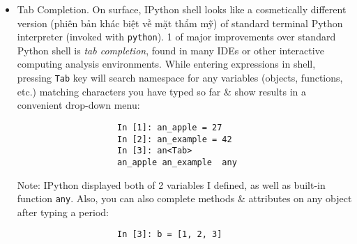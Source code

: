 \documentclass{article}
\newtheorem{remark}{Remark}
\begin{document}
\begin{enumerate}
\begin{itemize}
\begin{itemize}
\begin{itemize}
				\begin{remark}
					Many people use Jupyter as a local computing environment, but it can also be deployed on servers \& accessed remotely. Won't cover those details here, but encourage to explore this topic on internet if it's relevant to your needs.
				\end{remark}
				To create a new notebook, click {\tt New} button \& select {\tt Python 3} option. Should see sth like {\sf Fig. 2.2: Jupyter new notebook view}. If this is 1st time, try clicking on empty code ``cell'' \& entering a line of Python code. Then press Shift-Enter to execute it.
				
				When save notebook (see {\tt Save \& Checkpoint} under notebook {\tt File} menu), it creates a file with extension {\tt.ipynb}: a self-contained file format containing all of content (including any evaluated code output) currently in notebook. These can be loaded \& edited by other Jupyter users.
				
				To rename an open notebook, click on notebook title at top of page \& type new title, pressing {\tt Enter} when finished.
				
				To load an existing notebook, put file in same directory where started notebook process (or in a subfolder within it), then click name from landing page. Can try it out with notebooks from {\tt wesm/pydata-book} repository on GitHub {\sf Fig. 2.3: Jupyter example view for an existing notebook}.
				
				When want to close a notebook, click File menu \& select {\tt Close \& Halt}. If simply close browser tab, Python process associated with notebook will keep running in background.
				
				While Jupyter notebook may feel like a distinct experience from IPython shell, nearly all of commands \& tools in this chap can be used in either environment.
				\item {\sf Tab Completion.} On surface, IPython shell looks like a cosmetically different version (phiên bản khác biệt về mặt thẩm mỹ) of standard terminal Python interpreter (invoked with {\tt python}). 1 of major improvements over standard Python shell is {\it tab completion}, found in many IDEs or other interactive computing analysis environments. While entering expressions in shell, pressing {\tt Tab} key will search namespace for any variables (objects, functions, etc.) matching characters you have typed so far \& show results in a convenient drop-down menu:
				\begin{verbatim}
					In [1]: an_apple = 27
					In [2]: an_example = 42
					In [3]: an<Tab>
					an_apple an_example  any
				\end{verbatim}
				Note: IPython displayed both of 2 variables I defined, as well as built-in function {\tt any}. Also, you can also complete methods \& attributes on any object after typing a period:
				\begin{verbatim}
					In [3]: b = [1, 2, 3]
					

\end{verbatim}
\end{itemize}
\end{itemize}
\end{itemize}
\end{enumerate}
\end{document}
